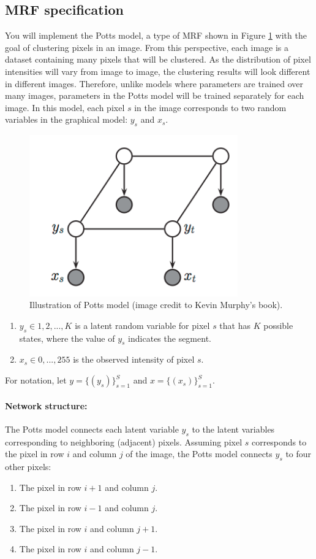 \documentclass[11pt]{article}
\begin{document}
\subsection{MRF specification}
You will implement the Potts model, a type of MRF shown in Figure \ref{fig:potts-model} with the goal of clustering pixels in an image. From this perspective, each image is a dataset containing many pixels that will be clustered. As the distribution of pixel intensities will vary from image to image, the clustering results will look different in different images. Therefore, unlike models where parameters are trained over many images, parameters in the Potts model will be trained separately for each image. In this model, each pixel $s$ in the image corresponds to two random variables in the graphical model: $y_s$ and $x_s$.

\begin{figure}\centering
    \includegraphics[width=90mm]{potts_model}
    \caption{Illustration of Potts model (image credit to Kevin Murphy's
      book).}
    \label{fig:potts-model}
\end{figure}

\begin{enumerate}
  \item $y_s \in {1, 2, ..., K}$ is a latent random variable for pixel $s$ that has $K$ possible states, where the value of $y_s$ indicates the segment.
  \item $x_s \in {0, ..., 255}$ is the observed intensity of pixel $s$.
\end{enumerate}

For notation, let $y=\{ (y_s) \}^S_{s=1}$ and $x=\{ (x_s) \}^S_{s=1}$.

\paragraph{Network structure:}
The Potts model connects each latent variable $y_s$ to the latent variables corresponding to neighboring (adjacent) pixels. Assuming pixel $s$ corresponds to the pixel in row $i$ and column $j$ of the image, the Potts model connects $y_s$ to four other pixels:
\begin{enumerate}
    \item The pixel in row $i+1$ and column $j$.
    \item The pixel in row $i-1$ and column $j$.
    \item The pixel in row $i$ and column $j+1$.
    \item The pixel in row $i$ and column $j-1$.
\end{enumerate}
\end{document}
